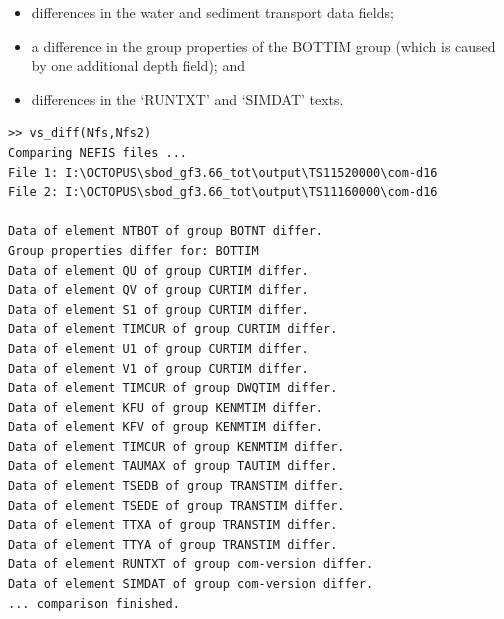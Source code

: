 \begin{itemize}
\item differences in the water and sediment transport data fields;
\item a difference in the group properties of the BOTTIM group (which is caused by one additional depth field); and
\item differences in the `RUNTXT' and `SIMDAT' texts.
\end{itemize}

\begin{Verbatim}
>> vs_diff(Nfs,Nfs2)
Comparing NEFIS files ...
File 1: I:\OCTOPUS\sbod_gf3.66_tot\output\TS11520000\com-d16
File 2: I:\OCTOPUS\sbod_gf3.66_tot\output\TS11160000\com-d16

Data of element NTBOT of group BOTNT differ.
Group properties differ for: BOTTIM
Data of element QU of group CURTIM differ.
Data of element QV of group CURTIM differ.
Data of element S1 of group CURTIM differ.
Data of element TIMCUR of group CURTIM differ.
Data of element U1 of group CURTIM differ.
Data of element V1 of group CURTIM differ.
Data of element TIMCUR of group DWQTIM differ.
Data of element KFU of group KENMTIM differ.
Data of element KFV of group KENMTIM differ.
Data of element TIMCUR of group KENMTIM differ.
Data of element TAUMAX of group TAUTIM differ.
Data of element TSEDB of group TRANSTIM differ.
Data of element TSEDE of group TRANSTIM differ.
Data of element TTXA of group TRANSTIM differ.
Data of element TTYA of group TRANSTIM differ.
Data of element RUNTXT of group com-version differ.
Data of element SIMDAT of group com-version differ.
... comparison finished.
\end{Verbatim}
